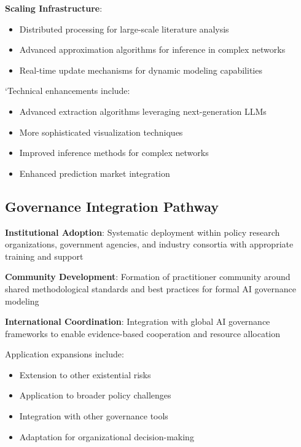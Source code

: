 \documentclass[
  11pt,
  letterpaper,
]{book}
\providecommand{\tightlist}{%
  \setlength{\itemsep}{0pt}\setlength{\parskip}{0pt}}
\begin{document}
\textbf{Scaling Infrastructure}:

\begin{itemize}
\tightlist
\item
  Distributed processing for large-scale literature analysis
\item
  Advanced approximation algorithms for inference in complex networks
\item
  Real-time update mechanisms for dynamic modeling capabilities
\end{itemize}

`Technical enhancements include:

\begin{itemize}
\tightlist
\item
  Advanced extraction algorithms leveraging next-generation LLMs
\item
  More sophisticated visualization techniques
\item
  Improved inference methods for complex networks
\item
  Enhanced prediction market integration
\end{itemize}

\subsection{Governance Integration
Pathway}\label{sec-governance-pathway}

\textbf{Institutional Adoption}: Systematic deployment within policy
research organizations, government agencies, and industry consortia with
appropriate training and support

\textbf{Community Development}: Formation of practitioner community
around shared methodological standards and best practices for formal AI
governance modeling

\textbf{International Coordination}: Integration with global AI
governance frameworks to enable evidence-based cooperation and resource
allocation

Application expansions include:

\begin{itemize}
\tightlist
\item
  Extension to other existential risks
\item
  Application to broader policy challenges
\item
  Integration with other governance tools
\item
  Adaptation for organizational decision-making
\end{itemize}
\end{document}
